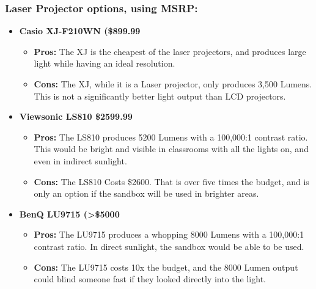 \documentclass[IEEEtran]{article}
\begin{document}
\subsubsection{Laser Projector options, using MSRP:}
\begin{itemize}
    \item \textbf{Casio XJ-F210WN (\$899.99}
    \begin{itemize}
        \item \textbf{Pros: }The XJ is the cheapest of the laser projectors, and produces large light while having an ideal resolution.  
        \item \textbf{Cons: }The XJ, while it is a Laser projector, only produces 3,500 Lumens. This is not a significantly better light output than LCD projectors.
    \end{itemize}
    \item \textbf{Viewsonic LS810 \$2599.99}
    \begin{itemize}
        \item \textbf{Pros: } The LS810 produces 5200 Lumens with a 100,000:1 contrast ratio. This would be bright and visible in classrooms with all the lights on, and even in indirect sunlight. 
        \item \textbf{Cons: } The LS810 Costs \$2600. That is over five times the budget, and is only an option if the sandbox will be used in brighter areas. 
    \end{itemize}
    \item \textbf{BenQ LU9715 (>\$5000}
    \begin{itemize}
        \item \textbf{Pros: } The LU9715 produces a whopping 8000 Lumens with a 100,000:1 contrast ratio. In direct sunlight, the sandbox would be able to be used. 
        \item \textbf{Cons: } The LU9715 costs 10x the budget, and the 8000 Lumen output could blind someone fast if they looked directly into the light. 
    \end{itemize}
\end{itemize}
\end{document}
